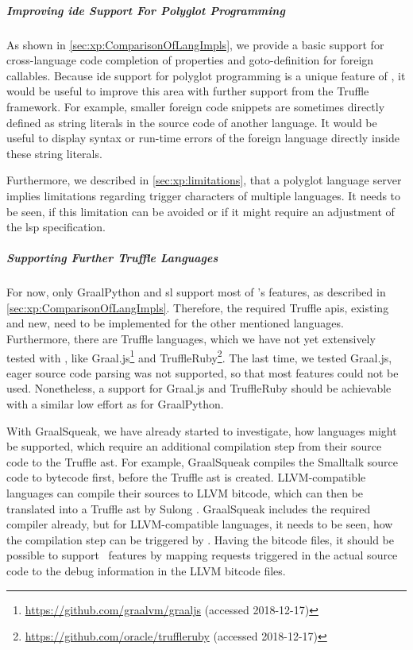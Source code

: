 \subparagraph{Improving \ac{ide} Support For Polyglot Programming}
As shown in \autoref{sec:xp:ComparisonOfLangImpls}, we provide a basic support for cross-language code completion of properties and goto-definition for foreign callables. Because \ac{ide} support for polyglot programming is a unique feature of \graallsp, it would be useful to improve this area with further support from the Truffle framework. For example, smaller foreign code snippets are sometimes directly defined as string literals in the source code of another language. It would be useful to display syntax or run-time errors of the foreign language directly inside these string literals.

Furthermore, we described in \autoref{sec:xp:limitations}, that a polyglot language server implies limitations regarding trigger characters of multiple languages. It needs to be seen, if this limitation can be avoided or if it might require an adjustment of the \ac{lsp} specification.

\subparagraph{Supporting Further Truffle Languages}
For now, only GraalPython and \ac{sl} support most of \graallsp's features, as described in \autoref{sec:xp:ComparisonOfLangImpls}. Therefore, the required Truffle \acp{api}, existing and new, need to be implemented for the other mentioned languages. Furthermore, there are Truffle languages, which we have not yet extensively tested with \graallsp, like Graal.js\footnote{\url{https://github.com/graalvm/graaljs} (accessed 2018-12-17)} and TruffleRuby\footnote{\url{https://github.com/oracle/truffleruby} (accessed 2018-12-17)}. The last time, we tested Graal.js, eager source code parsing was not supported, so that most features could not be used. Nonetheless, a support for Graal.js and TruffleRuby should be achievable with a similar low effort as for GraalPython.

With GraalSqueak, we have already started to investigate, how languages might be supported, which require an additional compilation step from their source code to the Truffle \ac{ast}. For example, GraalSqueak compiles the Smalltalk source code to bytecode first, before the Truffle \ac{ast} is created. LLVM-compatible languages can compile their sources to LLVM bitcode, which can then be translated into a Truffle \ac{ast} by Sulong \cite{rigger2016bringing}. GraalSqueak includes the required compiler already, but for LLVM-compatible languages, it needs to be seen, how the compilation step can be triggered by \graallsp. Having the bitcode files, it should be possible to support \graallsp~features by mapping requests triggered in the actual source code to the debug information in the LLVM bitcode files.

